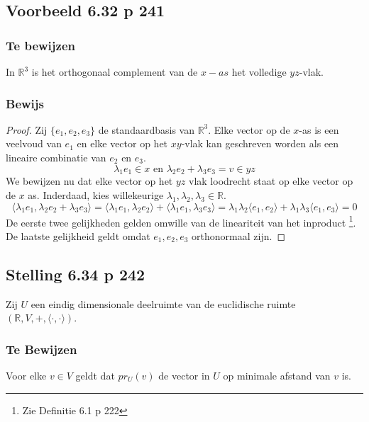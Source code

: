 \documentclass[lineaire_algebra_oplossingen.tex]{subfiles}
\begin{document}
\subsection{Voorbeeld 6.32 p 241}
\label{6.32}
\subsubsection*{Te bewijzen}
In $\mathbb{R}^3$ is het orthogonaal complement van de $x-as$ het volledige $yz$-vlak.

\subsubsection*{Bewijs}
\begin{proof}
Zij $\{e_1,e_2,e_3\}$ de standaardbasis van $\mathbb{R}^3$. Elke vector op de $x$-as is een veelvoud van $e_1$ en elke vector op het $xy$-vlak kan geschreven worden als een lineaire combinatie van $e_2$ en $e_3$.
\[
\lambda_1e_1 \in x \text{ en }\lambda_2e_2 + \lambda_3e_3 = v\in yz
\]
We bewijzen nu dat elke vector op het $yz$ vlak loodrecht staat op elke vector op de $x$ as.
Inderdaad, kies willekeurige $\lambda_1,\lambda_2,\lambda_3 \in \mathbb{R}$.
\[
\langle \lambda_1e_1 , \lambda_2e_2 + \lambda_3e_3 \rangle = \langle \lambda_1e_1 , \lambda_2e_2
\rangle + \langle \lambda_1e_1 , \lambda_3e_3 \rangle = \lambda_1\lambda_2\langle e_1 , e_2
\rangle + \lambda_1\lambda_3\langle e_1 , e_3 \rangle = 0
\]
De eerste twee gelijkheden gelden omwille van de lineariteit van het inproduct \footnote{Zie Definitie 6.1 p 222}.
De laatste gelijkheid geldt omdat $e_1,e_2,e_3$ orthonormaal zijn.
\end{proof}


\subsection{Stelling 6.34 p 242}
\label{6.34}
Zij $U$ een eindig dimensionale deelruimte van de euclidische ruimte $(\mathbb{R}, V,+, \langle \cdot,\cdot \rangle)$.

\subsubsection*{Te Bewijzen}
Voor elke $v\in V$ geldt dat $pr_U(v)$ de vector in $U$ op minimale afstand van $v$ is.
\end{document}
